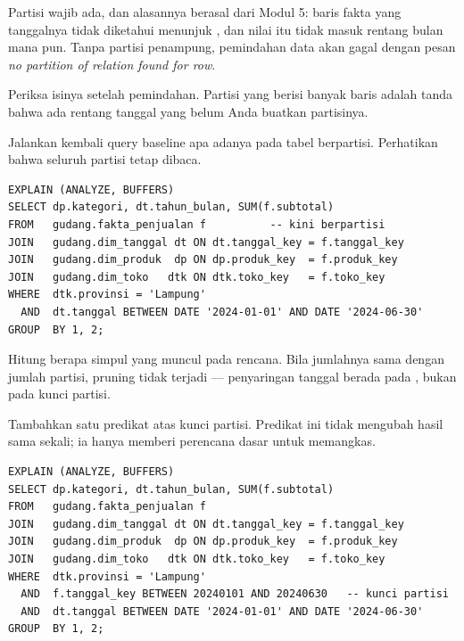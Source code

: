 \begin{peringatan}
Partisi  wajib ada, dan alasannya berasal dari Modul 5:
baris fakta yang tanggalnya tidak diketahui menunjuk
, dan nilai itu tidak masuk rentang bulan mana
pun. Tanpa partisi penampung, pemindahan data akan gagal dengan pesan
\emph{no partition of relation found for row}.

Periksa isinya setelah pemindahan. Partisi  yang berisi
banyak baris adalah tanda bahwa ada rentang tanggal yang belum Anda buatkan
partisinya.
\end{peringatan}


Jalankan kembali query baseline apa adanya pada tabel berpartisi. Perhatikan
bahwa seluruh partisi tetap dibaca.

\begin{lstlisting}[style=sqlgaya]
EXPLAIN (ANALYZE, BUFFERS)
SELECT dp.kategori, dt.tahun_bulan, SUM(f.subtotal)
FROM   gudang.fakta_penjualan f          -- kini berpartisi
JOIN   gudang.dim_tanggal dt ON dt.tanggal_key = f.tanggal_key
JOIN   gudang.dim_produk  dp ON dp.produk_key  = f.produk_key
JOIN   gudang.dim_toko   dtk ON dtk.toko_key   = f.toko_key
WHERE  dtk.provinsi = 'Lampung'
  AND  dt.tanggal BETWEEN DATE '2024-01-01' AND DATE '2024-06-30'
GROUP  BY 1, 2;
\end{lstlisting}

Hitung berapa simpul  yang muncul pada rencana. Bila
jumlahnya sama dengan jumlah partisi, pruning tidak terjadi --- penyaringan
tanggal berada pada , bukan pada kunci partisi.


Tambahkan satu predikat atas kunci partisi. Predikat ini tidak mengubah hasil
sama sekali; ia hanya memberi perencana dasar untuk memangkas.

\begin{lstlisting}[style=sqlgaya]
EXPLAIN (ANALYZE, BUFFERS)
SELECT dp.kategori, dt.tahun_bulan, SUM(f.subtotal)
FROM   gudang.fakta_penjualan f
JOIN   gudang.dim_tanggal dt ON dt.tanggal_key = f.tanggal_key
JOIN   gudang.dim_produk  dp ON dp.produk_key  = f.produk_key
JOIN   gudang.dim_toko   dtk ON dtk.toko_key   = f.toko_key
WHERE  dtk.provinsi = 'Lampung'
  AND  f.tanggal_key BETWEEN 20240101 AND 20240630   -- kunci partisi
  AND  dt.tanggal BETWEEN DATE '2024-01-01' AND DATE '2024-06-30'
GROUP  BY 1, 2;
\end{lstlisting}

